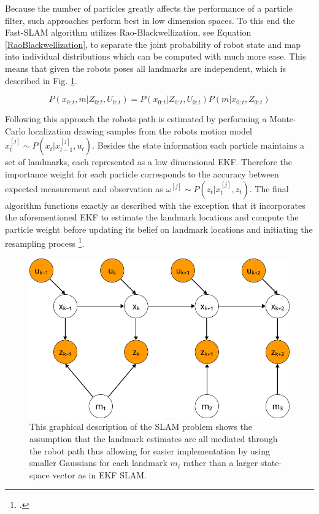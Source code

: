 Because the number of particles greatly affects the performance of a particle filter, such approaches perform best in low dimension spaces. To this end the Fast-SLAM algorithm utilizes Rao-Blackwellization, see Equation \ref{RaoBlackwellization}, to separate the joint probability of robot state and map into individual distributions which can be computed with much more ease.
This means that given the robots poses all landmarks are independent, which is described in Fig. \ref{fig:fastSlamGraphical}.

\begin{equation}\label{RaoBlackwellization}
	P(x_{0:t}, m | Z_{0:t}, U_{0:t}) = P(x_{0:t} | Z_{0:t}, U_{0:t}) P(m | x_{0:t}, Z_{0:t})
\end{equation}

Following this approach the robots path is estimated by performing a Monte-Carlo localization drawing samples from the robots motion model $x_{t}^{[j]} \sim P(x_{t} | x_{t-1}^{[j]}, u_{t}) $. Besides the state information each particle maintains a set of landmarks, each represented as a low dimensional EKF. Therefore the importance weight for each particle corresponds to the accuracy between expected measurement and observation as $ \omega^{[j]} \sim P(z_{t} | x_{t}^{[j]}, \overline{z}_{t}) $.
The final algorithm functions exactly as described with the exception that it incorporates the aforementioned EKF to estimate the landmark locations and compute the particle weight before updating its belief on landmark locations and initiating the resampling process \footcite[Pages 1159-1162]{stachniss2016simultaneous}. 


\begin{figure}
	\centering
	\includegraphics[width=0.5\linewidth]{img/FastSlamGraphical}
	\caption{
		This graphical description of the SLAM problem shows the assumption that the landmark estimates are all mediated through the robot path thus allowing for easier implementation by using smaller Gaussians for each landmark $m_{i}$ rather than a larger state-space vector as in EKF SLAM.
	}
	\label{fig:fastSlamGraphical}
\end{figure}

